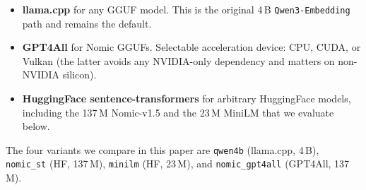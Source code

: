 \documentclass[sigconf]{acmart}
\begin{document}
\begin{itemize}
\item \textbf{llama.cpp} for any GGUF model. This is the original
  4\,B \texttt{Qwen3-Embedding} path and remains the default.
\item \textbf{GPT4All} for Nomic GGUFs. Selectable acceleration
  device: CPU, CUDA, or Vulkan (the latter avoids any NVIDIA-only
  dependency and matters on non-NVIDIA silicon).
\item \textbf{HuggingFace sentence-transformers} for arbitrary
  Hugging\-Face models, including the 137\,M Nomic-v1.5 and the
  23\,M MiniLM that we evaluate below.
\end{itemize}

The four variants we compare in this paper are \texttt{qwen4b}
(llama.cpp, 4\,B), \texttt{nomic\_st} (HF, 137\,M), \texttt{minilm}
(HF, 23\,M), and \texttt{nomic\_gpt4all} (GPT4All, 137\,M).



\end{document}
